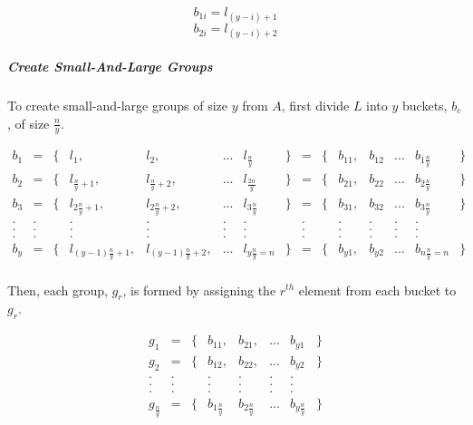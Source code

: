 	\begin{equation} b_{1i} = l_{(y-i)+1} \end{equation}
	\begin{equation} b_{2i} = l_{(y-i)+2} \end{equation}
	
	\subparagraph{Create Small-And-Large Groups}
	To create small-and-large groups of size $y$ from $A$, first divide $L$ into $y$ buckets, $b_c$, of size $\frac{n}{y}$.
	
	\begin{equation}
	\begin{array}{lclllclrcllllclr}
	b_1	& =	& \{	& l_1,				& l_2,				& ...	& l_{\frac{n}{y}}	& \}	& =	& \{ 	& b_{11},	& b_{12}	& ...	& b_{1 \frac{n}{y}} 	& \}	\\
	b_2	& =	& \{ 	& l_{\frac{n}{y}+1},		& l_{\frac{n}{y}+2},		& ...	& l_{\frac{2n}{y}}	& \}	& =	& \{ 	&  b_{21},	& b_{22}	& ...	& b_{2 \frac{n}{y}}	& \}	\\
	b_3	& =	& \{	& l_{2\frac{n}{y}+1},		& l_{2\frac{n}{y}+2},		& ...	& l_{3\frac{n}{y}}	& \}	& =	& \{ 	& b_{31},	& b_{32}	& ...	& b_{3 \frac{n}{y}}	& \}	\\
	.	& .	& 	& .				& .				& .	& .			& 	& .	&	& .		& .		& . 	& .			&	\\
	.	& .	& 	& .				& .				& .	& .			& 	& .	&	& .		& .		& . 	& .			&	\\
	.	& .	& 	& .				& .				& .	& .			& 	& .	&	& .		& .		& . 	& .			&	\\
	b_y	& =	& \{ 	& l_{(y-1)\frac{n}{y}+1},	& l_{(y-1)\frac{n}{y}+2},	& ...	& l_{y\frac{n}{y}=n} 	& \}	& =	& \{  	& b_{y1},	& b_{y2}	& ...	& b_{n\frac{n}{y}=n}	& \}	\\
	
	\end{array}
	\end{equation}
	
	Then, each group, $g_r$, is formed by assigning the $r^{th}$ element from each bucket to $g_r$.
	
	\begin{equation}
	\begin{array}{lclllclr}
	g_1		& =	& \{	& b_{11},		& b_{21},		& ...	& b_{y1}		& \}	\\
	g_2		& =	& \{	& b_{12},		& b_{22},		& ...	& b_{y2}		& \}	\\
	.		& .	&	& .			& .			& .	& .			& 	\\
	.		& .	&	& .			& .			& .	& .			& 	\\
	.		& .	&	& .			& .			& .	& .			& 	\\
	g_{\frac{n}{y}}	& =	& \{	& b_{1\frac{n}{y}}	& b_{2\frac{n}{y}}	& ...	& b_{y\frac{n}{y}}	& \}	\\
	\end{array}
	\end{equation}
	
